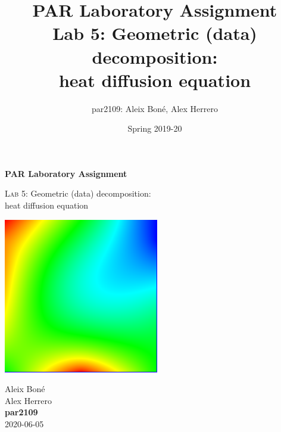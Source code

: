 

\usepackage[justification=centering]{caption}
\usepackage{subcaption}
\usepackage{graphicx}
\usepackage{enumitem}
\usepackage{lipsum}

\usepackage{siunitx}
\usepackage{hyphenat}

\usepackage{xcolor}


\usepackage[newfloat]{minted}
\captionsetup[listing]{position=top}

\graphicspath{{figures/}}


\renewcommand\theadfont{\bfseries}

\title{
    PAR Laboratory Assignment\\
    Lab 5: Geometric (data) decomposition: \\
    heat diffusion equation
}

\author{
    par2109:
    Aleix Boné,
    Alex Herrero
}

\date{
    Spring 2019-20
}



\thispagestyle{empty}
\clearpage
\setcounter{page}{-1}

\begin{titlepage}
{%
    \centering
    \null{}
    \vfill
    {\Huge \bfseries PAR Laboratory Assignment\par}
    \vspace{3em}
    {\Large {\scshape Lab 5:} 
    Geometric (data) decomposition: \\
    heat diffusion equation
\par}
    \vfill
\begin{center}
\end{center}
    \vspace{3cm}

    \includegraphics{images/jacobi}

    \vfill
    {\raggedleft{} \Large
        Aleix Boné\\
        Alex Herrero\\
        {\bfseries\ttfamily par2109}\\
        \vspace{4em}
        2020-06-05 %
        \par}
}
\end{titlepage}

